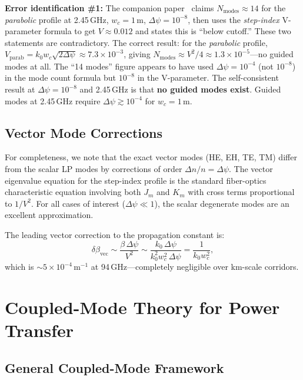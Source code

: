 \documentclass[journal,twocolumn]{IEEEtran}
\begin{document}
\textbf{Error identification \#1:} The companion paper~\cite{Alcock2025_P4}
claims $N_\text{modes} \approx 14$ for the \emph{parabolic} profile at
2.45\,GHz, $w_c = 1$\,m, $\Delta\psi = 10^{-8}$, then uses the
\emph{step-index} V-parameter formula to get $V \approx 0.012$ and
states this is ``below cutoff.'' These two statements are contradictory.
The correct result: for the \emph{parabolic} profile,
$V_\text{parab} = k_0 w_c \sqrt{2\Delta\psi} \approx 7.3\times10^{-3}$,
giving $N_\text{modes} \approx V^2/4 \approx 1.3\times10^{-5}$---no
guided modes at all. The ``14 modes'' figure appears to have used
$\Delta\psi = 10^{-4}$ (not $10^{-8}$) in the mode count formula but
$10^{-8}$ in the V-parameter. The self-consistent result at
$\Delta\psi = 10^{-8}$ and 2.45\,GHz is that \textbf{no guided modes
exist}. Guided modes at 2.45\,GHz require $\Delta\psi \gtrsim 10^{-4}$
for $w_c = 1$\,m.

\subsection{Vector Mode Corrections}\label{sec:vector}

For completeness, we note that the exact vector modes (HE, EH, TE, TM)
differ from the scalar LP modes by corrections of order
$\Delta n/n = \Delta\psi$. The vector eigenvalue equation for the
step-index profile is the standard fiber-optics characteristic equation
involving both $J_m$ and $K_m$ with cross terms proportional to
$1/V^2$. For all cases of interest ($\Delta\psi \ll 1$), the
scalar degenerate modes are an excellent approximation.

The leading vector correction to the propagation constant is:
\begin{equation}
\delta\beta_\text{vec} \sim \frac{\beta\,\Delta\psi}{V^2}
\sim \frac{k_0\,\Delta\psi}{k_0^2 w_c^2\,\Delta\psi}
= \frac{1}{k_0 w_c^2},
\end{equation}
which is $\sim 5\times10^{-4}\,\text{m}^{-1}$ at 94\,GHz---completely
negligible over km-scale corridors.

\section{Coupled-Mode Theory for Power Transfer}\label{sec:coupled_mode}

\subsection{General Coupled-Mode Framework}
\end{document}
